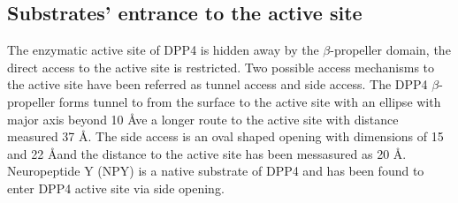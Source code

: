 \subsection{Substrates' entrance to the active site}

The enzymatic active site of DPP4 is hidden away by the $\beta$-propeller domain, the direct access to the active site is restricted. Two possible access mechanisms to the active site have been referred as tunnel access and side access. The DPP4 $\beta$-propeller forms tunnel to from the surface to the active site with an ellipse with major axis beyond 10 \AA ve a longer route to the active site with distance measured 37 \AA. The side access is an oval shaped opening with dimensions of 15 and 22 \AA and the distance to the active site has been messasured as 20 \AA.~\cite{Engel_2003, Rasmussen_2002,Weihofen_2004} Neuropeptide Y (NPY) is a native substrate of DPP4 and has been found to enter DPP4 active site via side opening. ~\cite{Aertgeerts_2004}